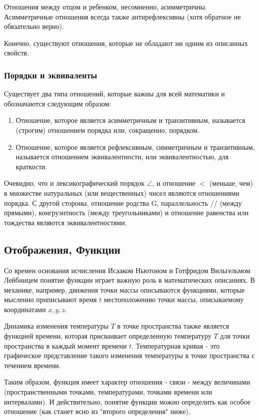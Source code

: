 Отношения между отцом и ребенком, несомненно, асимметричны. Асимметричные отношения всегда также антирефлексивны (хотя обратное не обязательно верно).

Конечно, существуют отношения, которые не обладают ни одним из описанных свойств.

\subsubsection{Порядки и эквиваленты}
Существует два типа отношений, которые важны для всей математики и обозначаются следующим образом:
\begin{enumerate}
  \item Отношение, которое является асимметричным и транзитивным, называется (строгим) отношением порядка или, сокращенно, порядком.
  \item Отношение, которое является рефлексивным, симметричным и транзитивным, называется отношением эквивалентности, или эквивалентностью, для краткости.
  \end{enumerate}

Очевидно, что и лексикографический порядок \(\angle\), и отношение \(<\) (меньше, чем) в множестве натуральных (или вещественных) чисел являются отношениями порядка.
С другой стороны, отношение родства G, параллельность // (между прямыми), конгруэнтность (между треугольниками) и отношение равенства или тождества являются эквивалентностями.

\subsection{Отображения, Функции}
Со времен основания исчисления Исааком Ньютоном и Готфридом Вильгельмом Лейбницем понятие функции играет важную роль в математических описаниях.
В механике, например, движения точки массы описываются функциями, которые мысленно приписывают время \(t\) местоположению точки массы, описываемому координатами \(x, y, z\).

Динамика изменения температуры \(T\) в точке пространства также является функцией времени, которая присваивает определенную температуру \(T\) для точки пространства в каждый момент времени \(t\).
Температурная кривая - это графическое представление такого изменения температуры в точке пространства с течением времени.

Таким образом, функция имеет характер отношения - связи - между величинами (пространственными точками, температурами, точками времени или интервалами).
И действительно, понятие функции можно определить как особое отношение (как станет ясно из "второго определения" ниже).

